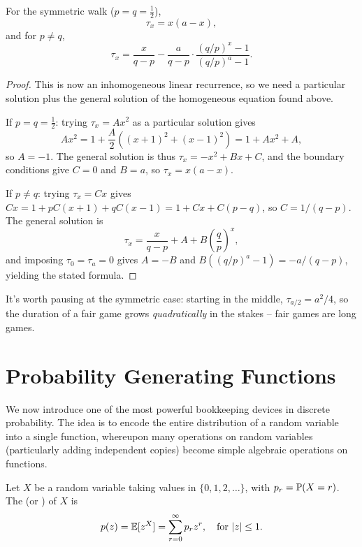 \documentclass[a4paper]{scrartcl}
\begin{document}
\begin{proposition}
	For the symmetric walk ($p = q = \frac12$),
	$$
	\tau_x = x(a - x),
	$$
	and for $p \neq q$,
	$$
	\tau_x = \frac{x}{q - p} - \frac{a}{q - p}\cdot \frac{(q/p)^x - 1}{(q/p)^a - 1}.
	$$
\end{proposition}
\begin{proof}
	This is now an inhomogeneous linear recurrence, so we need a particular solution plus the general solution of the homogeneous equation found above.

	If $p = q = \frac12$: trying $\tau_x = Ax^2$ as a particular solution gives
	$$
	Ax^2 = 1 + \frac{A}{2}\left((x+1)^2 + (x-1)^2\right) = 1 + Ax^2 + A,
	$$
	so $A = -1$. The general solution is thus $\tau_x = -x^2 + Bx + C$, and the boundary conditions give $C = 0$ and $B = a$, so $\tau_x = x(a - x)$.

	If $p \neq q$: trying $\tau_x = Cx$ gives $Cx = 1 + pC(x+1) + qC(x - 1) = 1 + Cx + C(p - q)$, so $C = 1/(q - p)$. The general solution is
	$$
	\tau_x = \frac{x}{q - p} + A + B\left(\frac{q}{p}\right)^x,
	$$
	and imposing $\tau_0 = \tau_a = 0$ gives $A = -B$ and $B\left((q/p)^a - 1\right) = -a/(q-p)$, yielding the stated formula.
\end{proof}

It's worth pausing at the symmetric case: starting in the middle, $\tau_{a/2} = a^2/4$, so the duration of a fair game grows \emph{quadratically} in the stakes -- fair games are long games.


\section{Probability Generating Functions}

We now introduce one of the most powerful bookkeeping devices in discrete probability. The idea is to encode the entire distribution of a random variable into a single function, whereupon many operations on random variables (particularly adding independent copies) become simple algebraic operations on functions.

\begin{definition}
	Let $X$ be a random variable taking values in $\{0, 1, 2, \dots\}$, with $p_r = \mathbb{P}(X = r)$. The  (or ) of $X$ is
	$$
	p(z) = \mathbb{E}[z^X] = \sum_{r = 0}^{\infty} p_r z^r, \quad \text{for } |z| \leq 1.
	$$
\end{definition}
\end{document}
